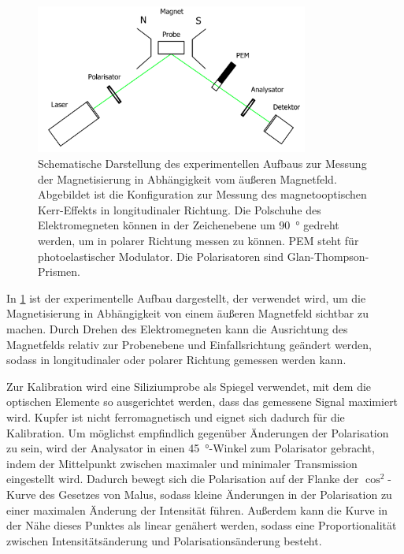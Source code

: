   \begin{figure}[H]
      \centering
      \includegraphics[width=0.8\textwidth]{img/setup2}
      \caption{Schematische Darstellung des experimentellen Aufbaus zur Messung der Magnetisierung in Abhängigkeit vom äußeren Magnetfeld. Abgebildet ist die Konfiguration zur Messung des magnetooptischen Kerr-Effekts in longitudinaler Richtung. Die Polschuhe des Elektromegneten können in der Zeichenebene um \SI{90}{\degree} gedreht werden, um in polarer Richtung messen zu können. PEM steht für photoelastischer Modulator. Die Polarisatoren sind Glan-Thompson-Prismen.}
      \label{fig_setup2}
  \end{figure}

  In \cref{fig_setup2} ist der experimentelle Aufbau dargestellt, der verwendet wird, um die Magnetisierung in Abhängigkeit von einem äußeren Magnetfeld sichtbar zu machen.
  Durch Drehen des Elektromegneten kann die Ausrichtung des Magnetfelds relativ zur Probenebene und Einfallsrichtung geändert werden, sodass in longitudinaler oder polarer Richtung gemessen werden kann.

  Zur Kalibration wird eine Siliziumprobe als Spiegel verwendet, mit dem die optischen Elemente so ausgerichtet werden, dass das gemessene Signal maximiert wird.
  Kupfer ist nicht ferromagnetisch und eignet sich dadurch für die Kalibration.
  Um möglichst empfindlich gegenüber Änderungen der Polarisation zu sein, wird der Analysator in einen \SI{45}{\degree}-Winkel zum Polarisator gebracht, indem der Mittelpunkt zwischen maximaler und minimaler Transmission eingestellt wird.
  Dadurch bewegt sich die Polarisation auf der Flanke der $\cos ^2$-Kurve des Gesetzes von Malus, sodass kleine Änderungen in der Polarisation zu einer maximalen Änderung der Intensität führen.
  Außerdem kann die Kurve in der Nähe dieses Punktes als linear genähert werden, sodass eine Proportionalität zwischen Intensitätsänderung und Polarisationsänderung besteht.

